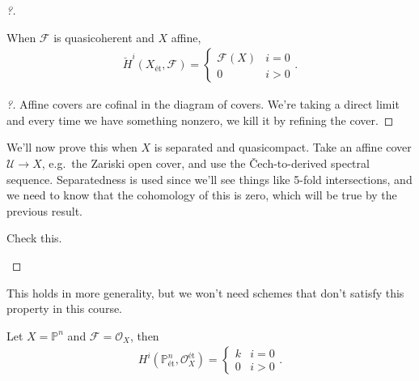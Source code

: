 \begin{proof}[?]
\begin{claim}[3]

When \(\mathcal{F}\) is quasicoherent and \(X\) affine,
\begin{align*}  
{\check{H}}^i(X_\text{ét}, \mathcal{F}) = 
\begin{cases}
\mathcal{F}(X) & i = 0 \\
0              & i>0
\end{cases}
.\end{align*}

\end{claim}

\begin{proof}[?]

Affine covers are cofinal in the diagram of covers. We're taking a
direct limit and every time we have something nonzero, we kill it by
refining the cover.

\end{proof}

We'll now prove this when \(X\) is separated and quasicompact. Take an
affine cover \(\mathcal{U}\to X\), e.g.~the Zariski open cover, and use
the Čech-to-derived spectral sequence. Separatedness is used since we'll
see things like 5-fold intersections, and we need to know that the
cohomology of this is zero, which will be true by the previous result.

\begin{exercise}[?]

Check this.

\end{exercise}

\end{proof}

\begin{remark}

This holds in more generality, but we won't need schemes that don't
satisfy this property in this course.

\end{remark}

\begin{example}[?]

Let \(X = {\mathbb{P}}^n\) and \(\mathcal{F} = {\mathcal{O}}_X\), then
\begin{align*}  
H^i({\mathbb{P}}^n_\text{ét}, {\mathcal{O}}_X^{\text{ét}}) = 
\begin{cases}
k & i= 0 \\
0 & i>0
\end{cases}
.\end{align*}

\end{example}

